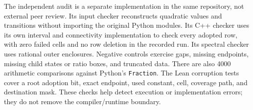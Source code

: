 \documentclass[11pt,a4paper]{article}
\newcommand{\file}[1]{{\normalfont\small\nolinkurl{#1}}}
\begin{document}
The independent audit is a separate implementation in the same
repository, not external peer review. Its input checker reconstructs
quadratic values and transitions without importing the original Python
modules. Its C++ checker uses its own interval and connectivity
implementation to check every adopted row, with zero failed cells and
no row deletion in the recorded run. Its spectral checker uses rational
outer enclosures. Negative controls exercise gaps, missing endpoints,
missing child states or ratio boxes, and truncated data. There are also
4000 arithmetic comparisons against Python's \file{Fraction}.
The Lean corruption tests cover a root adoption bit, exact endpoint,
used constant, cell, coverage path, and destination mask. These checks
help detect execution or implementation errors; they do not remove the
compiler/runtime boundary.
\end{document}
